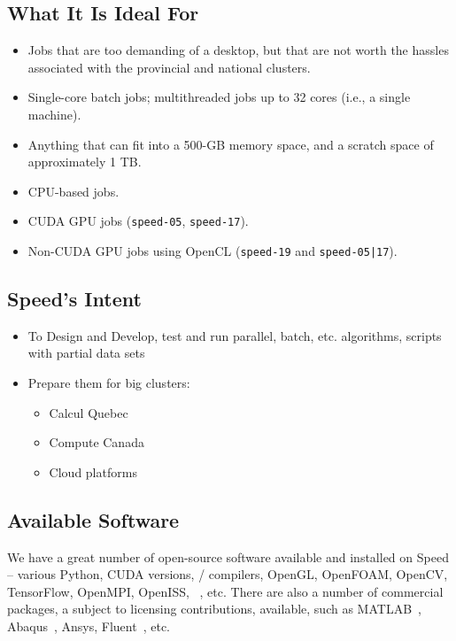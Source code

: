 \documentclass{easychair}
\begin{document}
\subsection{What It Is Ideal For}

\begin{itemize}
\item
Jobs that are too demanding of a desktop, but that are not worth the hassles associated with the provincial and national clusters. 
\item
Single-core batch jobs; multithreaded jobs up to 32 cores (i.e., a single machine).
\item
Anything that can fit into a 500-GB memory space, and a scratch space of approximately 1 TB. 
\item
CPU-based jobs. 
\item
CUDA GPU jobs (\texttt{speed-05}, \texttt{speed-17}).
\item
Non-CUDA GPU jobs using OpenCL (\texttt{speed-19} and \texttt{speed-05|17}).
\end{itemize}

\subsection{Speed's Intent}

\begin{itemize}
	\item 
To Design and Develop, test and run parallel, batch, etc. algorithms, scripts with partial data sets
	\item 
Prepare them for big clusters:
\begin{itemize}
	\item 
Calcul Quebec
	\item 
Compute Canada
	\item 
Cloud platforms
\end{itemize}
\end{itemize}

\subsection{Available Software}

We have a great number of open-source software available and installed
on Speed -- various Python, CUDA versions, {\cpp}/{\java} compilers, OpenGL,
OpenFOAM, OpenCV, TensorFlow, OpenMPI, OpenISS, {\marf}~\cite{marf}, etc.
There are also a number of commercial packages, a subject to licensing
contributions, available, such as MATLAB~\cite{matlab,scholarpedia-matlab}, Abaqus~\cite{abaqus}, 
Ansys, Fluent~\cite{fluent}, etc. 
\end{document}

